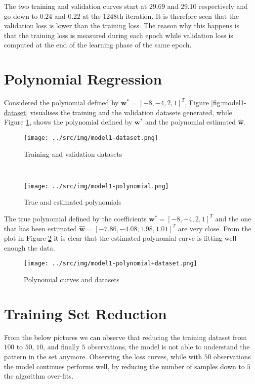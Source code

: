 \documentclass[a4paper,12pt]{article} %
\begin{document}
	The two training and validation curves start at $29.69$ and $29.10$ 
	respectively and go down to $0.24$ and $0.22$ at the $1248\mathrm{th}$ 
	iteration.
	It is therefore seen that the validation loss is lower than the training 
	loss. {\color{red}The reason why this happens is that the training loss is 
	measured during each epoch while validation loss is computed at the end of 
	the learning phase of the same epoch.}
	
	\section{Polynomial Regression} 
	Considered the polynomial defined by $\textbf{w}^*=[-8,-4,2,1]^T$, Figure 
	\ref{fig:model1-dataset} visualises the training and the validation 
	datasets generated, while Figure \ref{fig:model1-polynomial}, shows 
	the polynomial defined by $\textbf{w}^*$ and the polynomial estimated 
	$\hat{\textbf{w}}$.
	
	\begin{figure}[H]
		\begin{minipage}[c]{.49\textwidth}
			\centering
			\texttt{[image: ../src/img/model1-dataset.png]}
			\caption{Training and validation datasets}
			\label{fig:model1-dataset}
		\end{minipage}
		~
		\begin{minipage}[c]{.49\textwidth}
			\centering
			\texttt{[image: ../src/img/model1-polynomial.png]}
			\caption{True and estimated polynomials}
			\label{fig:model1-polynomial}
		\end{minipage}
	\end{figure}
	
 	The true polynomial defined by the coefficients 
 	$\textbf{w}^*=[-8,-4,2,1]^T$ and the one that has been estimated 
 	$\hat{\textbf{w}}=[-7.86,-4.08,1.98,1.01]^T$ are very close.
 	From the plot in Figure \ref{fig:model1-polynomial+dataset} it is clear 
 	that the estimated polynomial curve is fitting well enough the data.
 	
	\begin{figure}[H]
		\centering
		\texttt{[image: ../src/img/model1-polynomial+dataset.png]}
		\caption{Polynomial curves and datasets}
		\label{fig:model1-polynomial+dataset}
	\end{figure}
	
	\section{Training Set Reduction}
	From the below pictures we can observe that reducing the training dataset 
	from $100$ to $50$, $10$, and finally $5$ observations, the model is not 
	able to understand the pattern in the set anymore. Observing the 
	loss curves, while with $50$ observations the model continues performs 
	well, by reducing the number of samples down to $5$ the algorithm over-fits.
	
\end{document}
